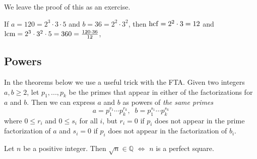 \documentclass[11pt,dvipsnames]{book}
\def\hcf{{\rm hcf}}
\numberwithin{equation}{section} %
\numberwithin{figure}{section} %
\numberwithin{table}{section} %
\begin{document}
We leave the proof of this as an exercise. 

\begin{example}
If $a=120=2^3\cdot 3\cdot 5$ and $b=36=2^2\cdot 3^2$, then 
$\hcf=2^2\cdot 3=12$ and $\rm lcm=2^3\cdot 3^2 \cdot 5=360=\frac{120\cdot 36}{12}$,
\end{example}

%
%
%
%
%
%

\subsection{Powers}

In the theorems below we use a useful trick with the FTA. Given two integers $a,b\geq 2$, let $p_{1},...,p_{k}$ be the primes that appear in either of the factorizations for $a$ and $b$. Then we can express $a$ and $b$ as powers of {\it the same primes}
\[
a=p_{1}^{r_{1}}\cdots p_{k}^{r_{k}}, \;\; b=p_{1}^{s_{1}}\cdots p_{k}^{s_{k}}
\]
where $0\leq r_{i}$ and $0\leq s_{i}$ for all $i$, but $r_{i}=0$ if $p_{i}$ does not appear in the prime factorization of $a$ and $s_{i}=0$ if $p_{i}$ does not appear in the factorization of $b_{i}$. 




\begin{theorem}
\label{t:perfectsquare}
 Let $n$ be a positive integer.  Then $\sqrt{n}\in\mathbb{Q}$ $\iff$ $n$ is a perfect square.
 \end{theorem}
 
\end{document}
